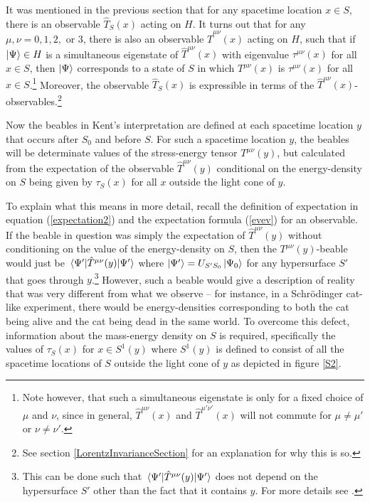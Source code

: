 It was mentioned in the previous section that for any spacetime location $x\in S$, there is an observable $\hat{T}_S(x)$ acting on $H$. It turns out that for any $\mu, \nu=0,1,2,$ or $3$, there is also an observable  $\hat{T}^{\mu\nu}(x)$ acting on $H$, such that if $\ket{\Psi}\in H$ is a simultaneous eigenstate of $\hat{T}^{\mu\nu}(x)$ with eigenvalue $\tau^{\mu\nu}(x)$ for all $x\in S$, then $\ket{\Psi}$ corresponds to a state of $S$ in which $T^{\mu\nu}(x)$ is  $\tau^{\mu\nu}(x)$ for all $x\in S$.\footnote{Note however, that such a simultaneous eigenstate is only for a fixed choice of $\mu$ and $\nu$, since in general, $\hat{T}^{\mu\nu}(x)$ and $\hat{T}^{\mu'\nu'}(x)$ will not commute for $\mu\neq\mu'$ or $\nu\neq\nu'$. } Moreover, the observable $\hat{T}_S(x)$ is expressible in terms of the  $\hat{T}^{\mu\nu}(x)$-observables.\footnote{See section  \ref{LorentzInvarianceSection} for an explanation for why this is so.} 

Now the  beables in Kent's interpretation are defined at each spacetime location $y$ that occurs after $S_0$ and before $S$. For such a spacetime location $y$, the beables will be determinate values of the stress-energy tensor $T^{\mu\nu}(y)$, but calculated from the expectation of the observable $\hat{T}^{\mu\nu}(y)$ conditional on the energy-density on $S$ being given by $\tau_S(x)$ for all $x$ outside the light cone of $y$. 

To explain what this means in more detail, recall the definition of expectation in equation (\ref{expectation2}) and the expectation formula (\ref{evev}) for an observable. If the beable in question was simply the expectation of $\hat{T}^{\mu\nu}(y)$ without conditioning on the value of the energy-density on $S$, then the $T^{\mu\nu}(y)$-beable would just be $\ev*{\hat{T}^{\mu\nu}(y)}{\Psi'}$ where $\ket{\Psi'}=U_{S'S_0}\ket{\Psi_0}$ for any hypersurface $S'$ that goes through $y$.\footnote{This can be done such that $\ev*{\hat{T}^{\mu\nu}(y)}{\Psi'}$ does not depend on the hypersurface $S'$ other than the fact that it contains $y$. For more details see \cite{SchwingerJulianI}.} However, such a beable would give a description of reality that was very different from what we observe -- for instance, in a Schr\"{o}dinger cat-like experiment, there would be energy-densities corresponding to both the cat being alive and the cat being dead in the same world. To overcome this defect, information about the mass-energy density on $S$ is required, specifically the values of $\tau_S(x)$ for $x\in S^1(y)$ where  $S^1(y)$ is defined to consist of all the spacetime locations of $S$ outside the light cone of $y$ as depicted in figure \ref{S2}.  



